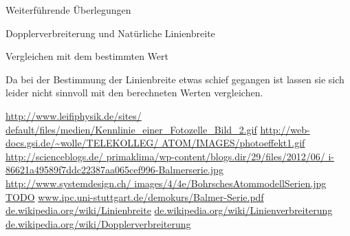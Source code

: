 \documentclass[pdftex, a4paper,11pt, twoside, ngerman]{report}
\begin{document}
\begin{chapter}{Weiterführende Überlegungen}
\begin{section}{Dopplerverbreiterung und Natürliche Linienbreite}
      
      
      \begin{subsection}{Vergleichen mit dem bestimmten Wert}
        \label{chp:Weiterfuehrendes:sec:Linienbreite:subsec:Vergleiche}
        
        Da bei der Bestimmung der Linienbreite etwas schief gegangen ist lassen sie sich leider nicht sinnvoll mit den berechneten Werten vergleichen.
        
      \end{subsection}
   
    \end{section}
    
    
    
   
  
  \end{chapter}
    
  
  
  
  
  
  
  
  \begin{thebibliography}{99}
    \scriptsize
    \url{http://www.leifiphysik.de/sites/
        default/files/medien/Kennlinie_einer_Fotozelle_Bild_2.gif}
    \url{http://web-docs.gsi.de/~wolle/TELEKOLLEG/
        ATOM/IMAGES/photoeffekt1.gif}
    \url{http://scienceblogs.de/
        primaklima/wp-content/blogs.dir/29/files/2012/06/
        i-86621a49589f7ddc22387aa065cef996-Balmerserie.jpg}
    \url{http://www.systemdesign.ch/
        images/4/4e/BohrschesAtommodellSerien.jpg}
     \url{TODO}
    \url{www.ipc.uni-stuttgart.de/demokurs/Balmer-Serie.pdf}
    \url{de.wikipedia.org/wiki/Linienbreite}
    \url{de.wikipedia.org/wiki/Linienverbreiterung}
\url{de.wikipedia.org/wiki/Dopplerverbreiterung}


  \end{thebibliography}
 
\end{document}
